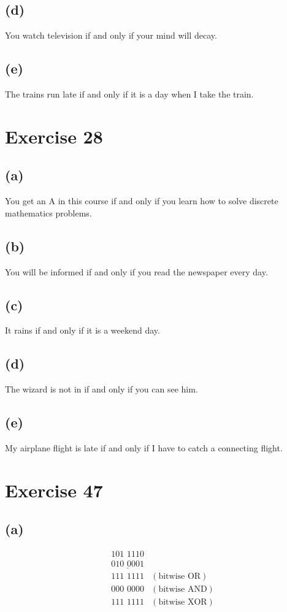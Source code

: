 \documentclass{article}
\begin{document}
	\subsection{(d)}
	You watch television if and only if your mind will decay.
	\subsection{(e)}
	The trains run late if and only if it is a day when I take the train.
	
	\pagebreak
	
	\section{Exercise 28}
	\subsection{(a)}
	You get an A in this course if and only if you learn how to solve discrete mathematics problems.
	\subsection{(b)}
	You will be informed if and only if you read the newspaper every day.
	\subsection{(c)}
	It rains if and only if it is a weekend day.
	\subsection{(d)}
	The wizard is not in if and only if you can see him.
	\subsection{(e)}
	My airplane flight is late if and only if I have to catch a connecting flight.
	
	\pagebreak
	
	\section{Exercise 47}
	\subsection{(a)}
	\begin{align*}
		&\text{101 1110} & \\
		&\underline{\text{010 0001}} & \\
		&\text{111 1111} & (\text{bitwise OR}) \\
		&\text{000 0000} & (\text{bitwise AND}) \\
		&\text{111 1111} & (\text{bitwise XOR}) \\
	\end{align*}
\end{document}
